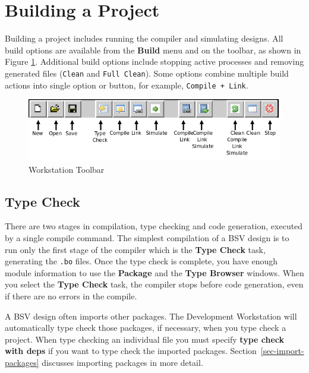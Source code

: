 \documentclass{article}
\newcommand{\te}[1]{\texttt{#1}}
\begin{document}

\section{Building a Project}
\label{build}

Building a project includes running the compiler and simulating designs.
 All build options are  available from the {\bf Build} menu and on the  toolbar, as shown in
Figure \ref{fig-toolbar}.  Additional build options include stopping
  active processes and removing
 generated files (\te{Clean} and
\te{Full Clean}).  Some  options combine multiple build actions into single
 option or button, for example,  \te{Compile + Link}.

\begin{figure}[ht]
\begin{center}
\includegraphics[width = 5.5 in]{figures/toolbar1}
\caption{Workstation Toolbar}
\label{fig-toolbar}
\end{center}
\end{figure}


\subsection{Type Check}
\label{sec-type check}
\index{.bo@\te{.bo}}

There are two stages in  compilation, type checking and
code generation, executed by a single compile command.
The simplest compilation of a BSV design is to run only the first
stage of the compiler which is the {\bf Type Check} task, generating
the \te{.bo} files.   Once the type check is
 complete, you have enough module
information to  use the {\bf Package}  and the {\bf Type Browser} windows.
When you select the {\bf Type Check} task, the compiler stops before
code generation, even if there are no errors in the compile.

A BSV design  often imports other packages.  The
Development Workstation will automatically type check those packages, if necessary,
when you type check  a project. When type checking an individual file you
must specify {\bf type check with deps} if you want to type check the imported
packages.   Section~\ref{sec-import-packages}
discusses importing packages in more detail.
\end{document}
